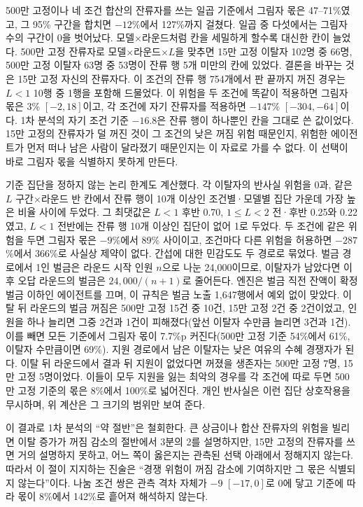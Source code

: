 500만 고정이나 네 조건 합산의 잔류자를 쓰는 일곱 기준에서 그림자 몫은 47--71\%였고, 그 95\% 구간을 합치면 $-12$\%에서 127\%까지 걸쳤다. 일곱 중 다섯에서는 그림자 수의 구간이 0을 벗어났다. 모델$\times$라운드처럼 칸을 세밀하게 할수록 대신한 칸이 늘었다. 500만 고정 잔류자로 모델$\times$라운드$\times L$을 맞추면 15만 고정 이탈자 102명 중 66명, 500만 고정 이탈자 63명 중 53명이 잔류 행 5개 미만의 칸에 있었다. 결론을 바꾸는 것은 15만 고정 자신의 잔류자다. 이 조건의 잔류 행 754개에서 판 끝까지 꺼진 경우는 $L<1$ 10행 중 1행을 포함해 드물었다. 이 위험을 두 조건에 똑같이 적용하면 그림자 몫은 3\% $[-2, 18]$이고, 각 조건에 자기 잔류자를 적용하면 $-147$\% $[-304, -64]$이다. 1차 분석의 자기 조건 기준 $-16.8$은 잔류 행이 하나뿐인 칸을 그대로 쓴 값이었다. 15만 고정의 잔류자가 덜 꺼진 것이 그 조건의 낮은 꺼짐 위험 때문인지, 위험한 에이전트가 먼저 떠나 남은 사람이 달라졌기 때문인지는 이 자료로 가를 수 없다. 이 선택이 바로 그림자 몫을 식별하지 못하게 만든다.

기준 집단을 정하지 않는 논리 한계도 계산했다. 각 이탈자의 반사실 위험을 0과, 같은 $L$ 구간$\times$라운드 반 칸에서 잔류 행이 10개 이상인 조건별·모델별 집단 가운데 가장 높은 비율 사이에 두었다. 그 최댓값은 $L<1$ 후반 0.70, $1\leq L<2$ 전·후반 0.25와 0.22였고, $L<1$ 전반에는 잔류 행 10개 이상인 집단이 없어 1로 두었다. 두 조건에 같은 위험을 두면 그림자 몫은 $-9$\%에서 89\% 사이이고, 조건마다 다른 위험을 허용하면 $-287$\%에서 366\%로 사실상 제약이 없다. 간섭에 대한 민감도도 두 경로로 묶었다. 벌금 경로에서 1인 벌금은 라운드 시작 인원 $n$으로 나눈 24,000이므로, 이탈자가 남았다면 이후 오답 라운드의 벌금은 $24{,}000/(n+1)$로 줄어든다. 엔진은 벌금 직전 잔액이 확정 벌금 이하인 에이전트를 끄며, 이 규칙은 벌금 노출 1,647행에서 예외 없이 맞았다. 이탈 뒤 라운드의 벌금 꺼짐은 500만 고정 15건 중 10건, 15만 고정 2건 중 2건이었고, 인원을 하나 늘리면 그중 2건과 1건이 피해졌다(앞선 이탈자 수만큼 늘리면 3건과 1건). 이를 빼면 모든 기준에서 그림자 몫이 7.7\%p 커진다(500만 고정 기준 54\%에서 61\%, 이탈자 수만큼이면 69\%). 지원 경로에서 남은 이탈자는 낮은 여유의 수혜 경쟁자가 된다. 이탈 뒤 라운드에서 결과 뒤 지원이 없었다면 꺼졌을 생존자는 500만 고정 7명, 15만 고정 5명이었다. 이들이 모두 지원을 잃는 최악의 경우를 각 조건에 따로 두면 500만 고정 기준의 몫은 8\%에서 100\%로 넓어진다. 개인 반사실은 이런 집단 상호작용을 무시하며, 위 계산은 그 크기의 범위만 보여 준다.

이 결과로 1차 분석의 ``약 절반''은 철회한다. 큰 상금이나 합산 잔류자의 위험을 빌리면 이탈 증가가 꺼짐 감소의 절반에서 3분의 2를 설명하지만, 15만 고정의 잔류자를 쓰면 거의 설명하지 못하고, 어느 쪽이 옳은지는 관측된 선택 아래에서 정해지지 않는다. 따라서 이 절이 지지하는 진술은 ``경쟁 위험이 꺼짐 감소에 기여하지만 그 몫은 식별되지 않는다''이다. 나눔 조건 쌍은 관측 격차 자체가 $-9$ $[-17, 0]$로 0에 닿고 기준에 따라 몫이 8\%에서 142\%로 흩어져 해석하지 않는다.

